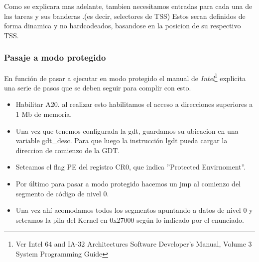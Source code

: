 Como se explicara mas adelante, tambien necesitamos entradas para cada una de las tareas y sus banderas .(es decir, selectores de TSS) Estos
seran definidos de forma dinamica y no hardcodeados, basandose en la posicion de su respectivo TSS.

\subsubsection{Pasaje a modo protegido}

En funci\'on de pasar a ejecutar en modo protegido el manual de \emph{Intel}\footnote{Ver Intel 64 and IA-32 Architectures Software 
Developer's Manual, Volume 3 System Programming Guide} explicita una serie de pasos que se deben seguir para complir con esto.\\
\begin{itemize}
 \item Habilitar A20. al realizar esto habilitamos el acceso a direcciones superiores a 1 Mb de memoria.
 \item Una vez que tenemos configurada la gdt, guardamos su ubicacion en una variable gdt\_desc. Para que luego la instrucci\'on lgdt 
pueda cargar la direccion de comienzo de la GDT.
 \item Seteamos el flag PE del registro CR0, que indica ''Protected Envirnoment''.
 \item Por \'ultimo para pasar a modo protegido hacemos un jmp al comienzo del segmento de c\'odigo de nivel 0.
 \item Una vez ah\'i acomodamos todos los segmentos apuntando a datos de nivel 0 y seteamos la pila del Kernel en 0x27000 seg\'un lo
indicado por el enunciado.
\end{itemize}
